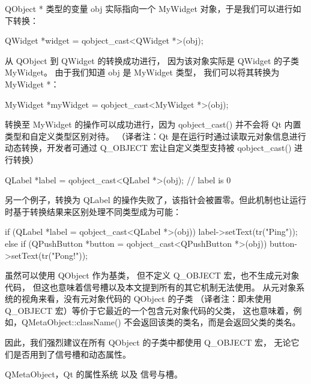 QObject * 类型的变量 obj 实际指向一个 MyWidget 对象，于是我们可以进行如下转换：

\begin{cppcode}
QWidget *widget = qobject_cast<QWidget *>(obj);
\end{cppcode}

从 QObject 到 QWidget 的转换成功进行，
因为该对象实际是 QWidget 的子类 MyWidget。
由于我们知道 obj 是 MyWidget 类型，
我们可以将其转换为 MyWidget *：

\begin{cppcode}
MyWidget *myWidget = qobject_cast<MyWidget *>(obj);
\end{cppcode}

转换至 MyWidget 的操作可以成功进行，因为 qobject\_cast() 并不会将 Qt 内置类型和自定义类型区别对待。
（译者注：Qt 是在运行时通过读取元对象信息进行动态转换，开发者可通过 Q\_OBJECT 宏让自定义类型支持被 qobject\_cast() 进行转换）

\begin{cppcode}
QLabel *label = qobject_cast<QLabel *>(obj);
// label is 0
\end{cppcode}

另一个例子，转换为 QLabel 的操作失败了，该指针会被置零。但此机制也让运行时基于转换结果来区别处理不同类型成为可能：

\begin{cppcode}
if (QLabel *label = qobject_cast<QLabel *>(obj)) {
    label->setText(tr("Ping"));
} else if (QPushButton *button = qobject_cast<QPushButton *>(obj)) {
    button->setText(tr("Pong!"));
}
\end{cppcode}

虽然可以使用 QObject 作为基类，
但不定义 Q\_OBJECT 宏，也不生成元对象代码，
但这也意味着信号槽以及本文提到所有的其它机制无法使用。
从元对象系统的视角来看，没有元对象代码的 QObject 的子类
（译者注：即未使用 Q\_OBJECT 宏）等价于它最近的一个包含元对象代码的父类，
这也意味着，例如，QMetaObject::className() 不会返回该类的类名，而是会返回父类的类名。

因此，我们强烈建议在所有 QObject 的子类中都使用 Q\_OBJECT 宏，
无论它们是否用到了信号槽和动态属性。

\begin{seeAlso}
QMetaObject，Qt 的属性系统 以及 信号与槽。
\end{seeAlso}